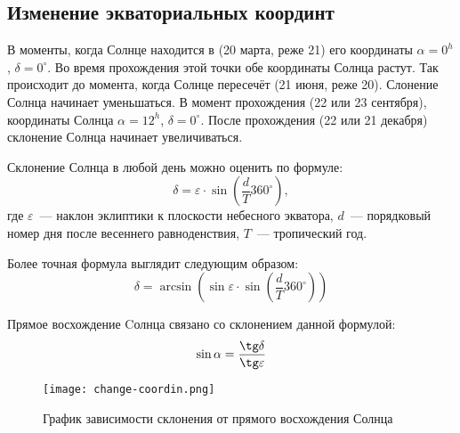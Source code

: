 \subsection{Изменение экваториальных координт}
В моменты, когда Солнце находится в  (20 марта, реже 21) его координаты $\alpha=0^h$, $\delta=0^{\circ}$. Во время прохождения этой точки обе координаты Солнца растут. Так происходит до момента, когда Солнце пересечёт  (21 июня, реже 20). Слонение Солнца начинает уменьшаться. В момент прохождения  (22 или 23 сентября), координаты Солнца $\alpha=12^h$, $\delta=0^{\circ}$. После прохождения  (22 или 21 декабря) склонение Солнца начинает увеличиваться.

Склонение Солнца в любой день можно оценить по формуле:
\begin{equation}
\delta=\varepsilon\cdot\sin \left(\frac{d}{T}360^{\circ}\right),
\end{equation}
где $\varepsilon$~--- наклон эклиптики к плоскости небесного экватора, $d$~--- порядковый номер дня после весеннего равноденствия, $T$~--- тропический год.

Более точная формула выглядит следующим образом:
\begin{equation}
\delta=\arcsin\left(\sin\varepsilon\cdot\sin \left(\frac{d}{T}360^{\circ}\right)\right)
\end{equation}

Прямое восхождение Cолнца связано со склонением данной формулой:
\begin{equation}
\sin\alpha=\frac{\tg\delta}{\tg\varepsilon}
\end{equation}

\begin{figure}[!h]
\centering
\texttt{[image: change-coordin.png]}
\caption{График зависимости склонения от прямого восхождения Солнца}
\end{figure}